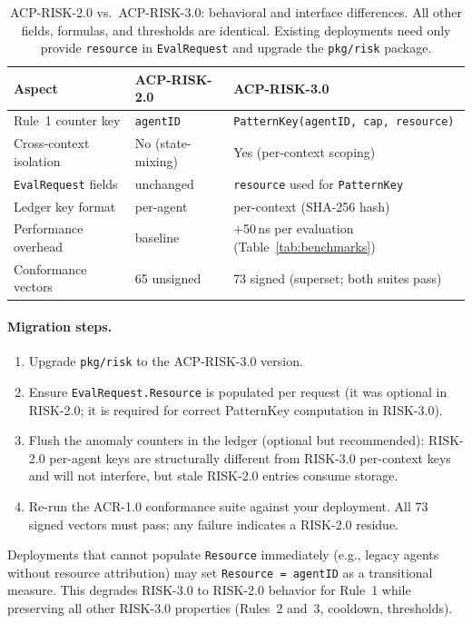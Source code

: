 \documentclass[11pt]{article}
\theoremstyle{definition}
\begin{document}
\begin{table}[h!]
\centering\small
\caption{ACP-RISK-2.0 vs.\ ACP-RISK-3.0: behavioral and interface differences.
All other fields, formulas, and thresholds are identical.
Existing deployments need only provide \texttt{resource} in \texttt{EvalRequest}
and upgrade the \texttt{pkg/risk} package.}
\label{tab:migration}
\begin{tabular}{@{}lll@{}}
\toprule
Aspect & ACP-RISK-2.0 & ACP-RISK-3.0 \\
\midrule
Rule~1 counter key   & \texttt{agentID} & \texttt{PatternKey(agentID, cap, resource)} \\
Cross-context isolation & No (state-mixing) & Yes (per-context scoping) \\
\texttt{EvalRequest} fields & unchanged & \texttt{resource} used for \texttt{PatternKey} \\
Ledger key format    & per-agent & per-context (SHA-256 hash) \\
Performance overhead & baseline & $+$50\,ns per evaluation (Table~\ref{tab:benchmarks}) \\
Conformance vectors  & 65 unsigned & 73 signed (superset; both suites pass) \\
\bottomrule
\end{tabular}
\end{table}

\paragraph{Migration steps.}
\begin{enumerate}[noitemsep]
  \item Upgrade \texttt{pkg/risk} to the ACP-RISK-3.0 version.
  \item Ensure \texttt{EvalRequest.Resource} is populated per request
    (it was optional in RISK-2.0; it is required for correct PatternKey computation in RISK-3.0).
  \item Flush the anomaly counters in the ledger (optional but recommended):
    RISK-2.0 per-agent keys are structurally different from RISK-3.0 per-context keys
    and will not interfere, but stale RISK-2.0 entries consume storage.
  \item Re-run the ACR-1.0 conformance suite against your deployment.
    All 73 signed vectors must pass; any failure indicates a RISK-2.0 residue.
\end{enumerate}

\noindent Deployments that cannot populate \texttt{Resource} immediately
(e.g., legacy agents without resource attribution)
may set \texttt{Resource = agentID} as a transitional measure.
This degrades RISK-3.0 to RISK-2.0 behavior for Rule~1 while preserving
all other RISK-3.0 properties (Rules~2 and~3, cooldown, thresholds).
\end{document}
